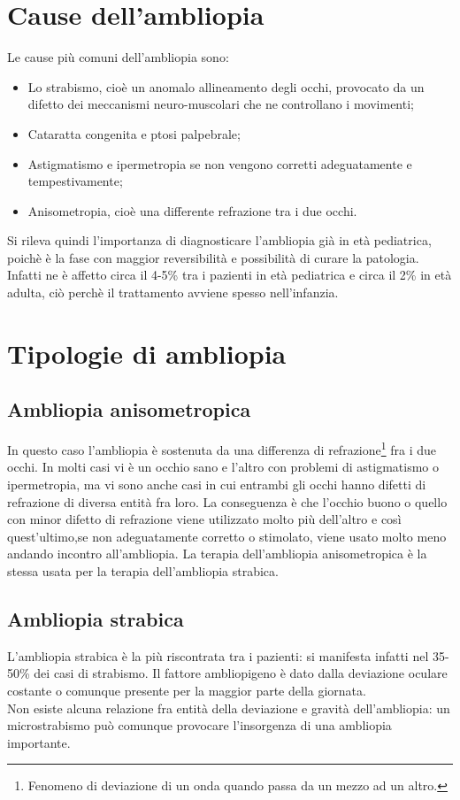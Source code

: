 \documentclass[12pt,a4paper,openright,twoside]{book}
\begin{document}
    \section{Cause dell'ambliopia}
    Le cause più comuni dell'ambliopia sono:
    \begin{itemize}
    	\item Lo strabismo, cioè un anomalo allineamento degli occhi, provocato da un difetto dei meccanismi neuro-muscolari che ne controllano i movimenti;
    	\item Cataratta congenita e ptosi palpebrale;
    	\item Astigmatismo e ipermetropia se non vengono corretti adeguatamente e tempestivamente;
    	\item Anisometropia, cioè una differente refrazione tra i due occhi. \cite{humamb}
    \end{itemize}
	Si rileva quindi l'importanza di diagnosticare l'ambliopia già in età pediatrica, poichè è la fase con maggior reversibilità e possibilità di curare la patologia. Infatti ne è affetto circa il 4-5\% tra i pazienti in età pediatrica e circa il 2\% in età adulta, ciò 
	perchè il trattamento avviene spesso nell'infanzia.
	\section{Tipologie di ambliopia}
	\subsection{Ambliopia anisometropica}
	In questo caso l'ambliopia è sostenuta da una differenza di refrazione\footnote{Fenomeno di deviazione di un onda quando passa da un mezzo ad un altro.} fra i due occhi. In molti casi vi è un occhio sano e l'altro con problemi di astigmatismo o ipermetropia, ma vi sono anche casi in cui entrambi gli occhi hanno difetti di refrazione di diversa entità fra loro.
	La conseguenza è che l'occhio buono o quello con minor difetto di refrazione viene utilizzato molto
	più dell'altro e così quest'ultimo,se non adeguatamente corretto o stimolato, viene usato molto meno
	andando incontro all'ambliopia.
	La terapia dell'ambliopia anisometropica è la stessa usata per la terapia dell'ambliopia strabica.  \cite{strabpedr}
	\subsection{Ambliopia strabica} 
	L'ambliopia strabica è la più riscontrata tra i pazienti: si manifesta infatti nel 35-50\% dei casi di strabismo. Il fattore ambliopigeno è dato dalla deviazione oculare costante o comunque presente per la
	maggior parte della giornata. \\
	Non esiste alcuna relazione fra entità della deviazione e gravità dell’ambliopia: un microstrabismo
	può comunque provocare l’insorgenza di una ambliopia importante. 
\end{document}
